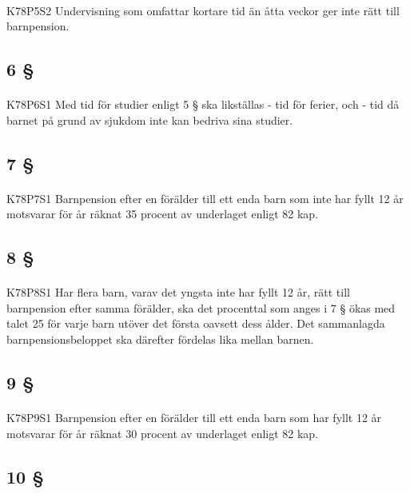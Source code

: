 \documentclass[a4paper,notitlepage,openany,10pt]{book}
\begin{document}
\paragraph*{}
{\tiny K78P5S2}
Undervisning som omfattar kortare tid än åtta veckor ger inte rätt till barnpension.
\subsection*{6 §}
\paragraph*{}
{\tiny K78P6S1}
Med tid för studier enligt 5 § ska likställas
\newline - tid för ferier, och
\newline - tid då barnet på grund av sjukdom inte kan bedriva sina studier.
\subsection*{7 §}
\paragraph*{}
{\tiny K78P7S1}
Barnpension efter en förälder till ett enda barn som inte har fyllt 12 år motsvarar för år räknat 35 procent av underlaget enligt 82 kap.
\subsection*{8 §}
\paragraph*{}
{\tiny K78P8S1}
Har flera barn, varav det yngsta inte har fyllt 12 år, rätt till barnpension efter samma förälder, ska det procenttal som anges i 7 § ökas med talet 25 för varje barn utöver det första oavsett dess ålder. Det sammanlagda barnpensionsbeloppet ska därefter fördelas lika mellan barnen.
\subsection*{9 §}
\paragraph*{}
{\tiny K78P9S1}
Barnpension efter en förälder till ett enda barn som har fyllt 12 år motsvarar för år räknat 30 procent av underlaget enligt 82 kap.
\subsection*{10 §}
\end{document}

